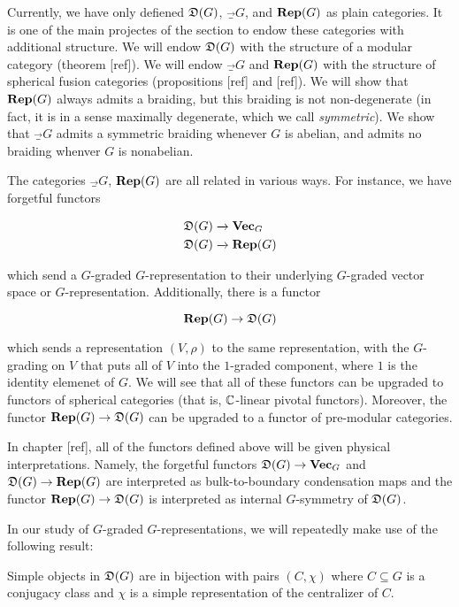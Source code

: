 Currently, we have only defiened ${\mathfrak D}(G)$, $\Vec_G$, and ${\bf Rep}(G)$ as plain categories. It is one of the main projectes of the section to endow these categories with additional structure. We will endow ${\mathfrak D}(G)$  with the structure of a modular category (theorem [ref]). We will endow $\Vec_G$ and ${\bf Rep}(G)$ with the structure of spherical fusion categories (propositions [ref] and [ref]). We will show that ${\bf Rep}(G)$ always admits a braiding, but this braiding is not non-degenerate (in fact, it is in a sense maximally degenerate, which we call {\em symmetric}). We show that $\Vec_G$ admits a symmetric braiding whenever $G$ is abelian, and admits no braiding whenver $G$ is nonabelian.

The categories $\Vec_G$, ${\bf Rep}(G)$ are all related in various ways. For instance, we have forgetful functors

\begin{align*}
{\mathfrak D}(G)&\xrightarrow{}{\bf Vec}_G\\
{\mathfrak D}(G)&\xrightarrow{}{\bf Rep}(G)
\end{align*}

which send a $G$-graded $G$-representation to their underlying $G$-graded vector space or $G$-representation. Additionally, there is a functor

$${\bf Rep}(G)\to {\mathfrak D}(G)$$

which sends a representation $(V,\rho)$ to the same representation, with the $G$-grading on $V$ that puts all of $V$ into the $1$-graded component, where $1$ is the identity elemenet of $G$. We will see that all of these functors can be upgraded to functors of spherical categories (that is, ${\mathbb C}$-linear pivotal functors). Moreover, the functor ${\bf Rep}(G)\to {\mathfrak D}(G)$ can be upgraded to a functor of pre-modular categories.

\begin{rem}
In chapter [ref], all of the functors defined above will be given physical interpretations. Namely, the forgetful functors ${\mathfrak D}(G)\to {\bf Vec}_{G}$ and ${\mathfrak D}(G)\to{\bf Rep}(G)$ are interpreted as bulk-to-boundary condensation maps and the functor ${\bf Rep}(G)\to {\mathfrak D}(G)$ is interpreted as internal $G$-symmetry of ${\mathfrak D}(G)$.
\end{rem}

In our study of $G$-graded $G$-representations, we will repeatedly make use of the following result:

\begin{prop}\label{DG-simples} Simple objects in ${\mathfrak D}(G)$ are in bijection with pairs $(C,\chi)$ where $C\subseteq G$ is a conjugacy class and $\chi$ is a simple representation of the centralizer of $C$. 
\end{prop}


